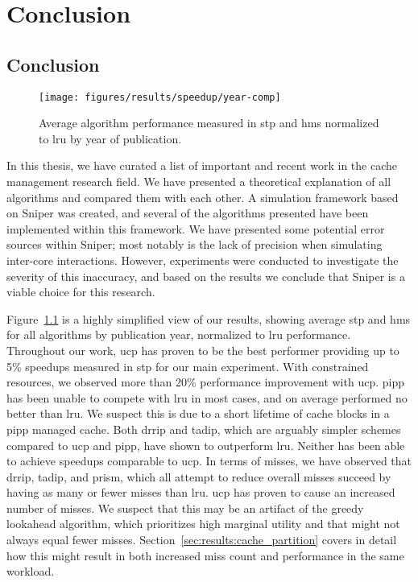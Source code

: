 
\chapter{Conclusion}
\label{cpt:conclusion}

\section{Conclusion}

\begin{figure}[ht]
    \centering
    \texttt{[image: figures/results/speedup/year-comp]}
    \caption[Average algorithm performance by year of publication]{Average algorithm performance measured in \gls{stp} and \gls{hms} normalized to \gls{lru} by year of publication.}
    \label{fig:conclusion:yearcomp}
\end{figure}

In this thesis, we have curated a list of important and recent work in the cache management research field.
We have presented a theoretical explanation of all algorithms and compared them with each other.
A simulation framework based on Sniper was created, and several of the algorithms presented have been implemented within this framework.
We have presented some potential error sources within Sniper; most notably is the lack of precision when simulating inter-core interactions.
However, experiments were conducted to investigate the severity of this inaccuracy, and based on the results we conclude that Sniper is a viable choice for this research.

Figure~\ref{fig:conclusion:yearcomp} is a highly simplified view of our results, showing average \gls{stp} and \gls{hms} for all algorithms by publication year, normalized to \gls{lru} performance.
Throughout our work, \gls{ucp} has proven to be the best performer providing up to 5\% speedups measured in \gls{stp} for our main experiment.
With constrained resources, we observed more than 20\% performance improvement with \gls{ucp}.
\gls{pipp} has been unable to compete with \gls{lru} in most cases, and on average performed no better than \gls{lru}.
We suspect this is due to a short lifetime of cache blocks in a \gls{pipp} managed cache.
Both \gls{drrip} and \gls{tadip}, which are arguably simpler schemes compared to \gls{ucp} and \gls{pipp}, have shown to outperform \gls{lru}.
Neither has been able to achieve speedups comparable to \gls{ucp}.
In terms of misses, we have observed that \gls{drrip}, \gls{tadip}, and \gls{prism}, which all attempt to reduce overall misses succeed by having as many or fewer misses than \gls{lru}.
\gls{ucp} has proven to cause an increased number of misses.
We suspect that this may be an artifact of the greedy lookahead algorithm, which prioritizes high marginal utility and that might not always equal fewer misses.
Section~\ref{sec:results:cache_partition} covers in detail how this might result in both increased miss count and performance in the same workload.



